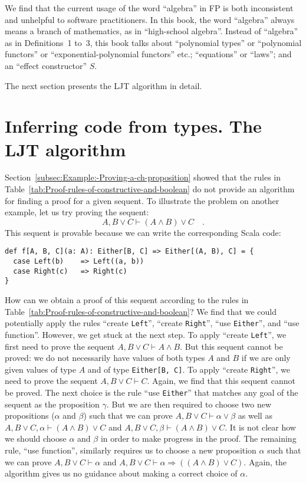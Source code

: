 We find that the current usage of the word \textsf{``}algebra\textsf{''} in FP is
both inconsistent and unhelpful to software practitioners. In this
book, the word \textsf{``}algebra\textsf{''} always means a branch of mathematics,
as in \textsf{``}high-school algebra\textsf{''}. Instead of \textsf{``}algebra\textsf{''} as in Definitions~1
to~3, this book talks about \textsf{``}polynomial types\textsf{''} or \textsf{``}polynomial
functors\textsf{''} or \textsf{``}exponential-polynomial functors\textsf{''} etc.; \textsf{``}equations\textsf{''}
or \textsf{``}laws\textsf{''}; and an \textsf{``}effect constructor\textsf{''} $S$. 

The next section presents the LJT algorithm in detail.

\chapter{Inferring code from types. The LJT algorithm\label{app:The-LJT-algorithm}}

Section~\ref{subsec:Example:-Proving-a-ch-proposition} showed that
the rules in Table~\ref{tab:Proof-rules-of-constructive-and-boolean}
do not provide an algorithm for finding a proof for a given sequent.
To illustrate the problem on another example, let us try proving the
sequent:
\[
A,B\vee C\vdash(A\wedge B)\vee C\quad.
\]
This sequent is provable because we can write the corresponding Scala
code:
\begin{lstlisting}
def f[A, B, C](a: A): Either[B, C] => Either[(A, B), C] = {
  case Left(b)    => Left((a, b))
  case Right(c)   => Right(c)
}
\end{lstlisting}
How can we obtain a proof of this sequent according to the rules in
Table~\ref{tab:Proof-rules-of-constructive-and-boolean}? We find
that we could potentially apply the rules \textsf{``}create \lstinline!Left!\textsf{''},
\textsf{``}create \lstinline!Right!\textsf{''}, \textsf{``}use \lstinline!Either!\textsf{''}, and
\textsf{``}use function\textsf{''}. However, we get stuck at the next step. To apply
\textsf{``}create \lstinline!Left!\textsf{''}, we first need to prove the sequent
$A,B\vee C\vdash A\wedge B$. But this sequent cannot be proved: we
do not necessarily have values of both types $A$ and $B$ if we are
only given values of type $A$ and of type \lstinline!Either[B, C]!.
To apply \textsf{``}create \lstinline!Right!\textsf{''}, we need to prove the sequent
$A,B\vee C\vdash C$. Again, we find that this sequent cannot be proved.
The next choice is the rule \textsf{``}use \lstinline!Either!\textsf{''} that matches
any goal of the sequent as the proposition $\gamma$. But we are then
required to choose two new propositions ($\alpha$ and $\beta$) such
that we can prove $A,B\vee C\vdash\alpha\vee\beta$ as well as $A,B\vee C,\alpha\vdash(A\wedge B)\vee C$
and $A,B\vee C,\beta\vdash(A\wedge B)\vee C$. It is not clear how
we should choose $\alpha$ and $\beta$ in order to make progress
in the proof. The remaining rule, \textsf{``}use function\textsf{''}, similarly requires
us to choose a new proposition $\alpha$ such that we can prove $A,B\vee C\vdash\alpha$
and $A,B\vee C\vdash\alpha\Rightarrow((A\wedge B)\vee C)$. Again,
the algorithm gives us no guidance about making a correct choice of
$\alpha$.

